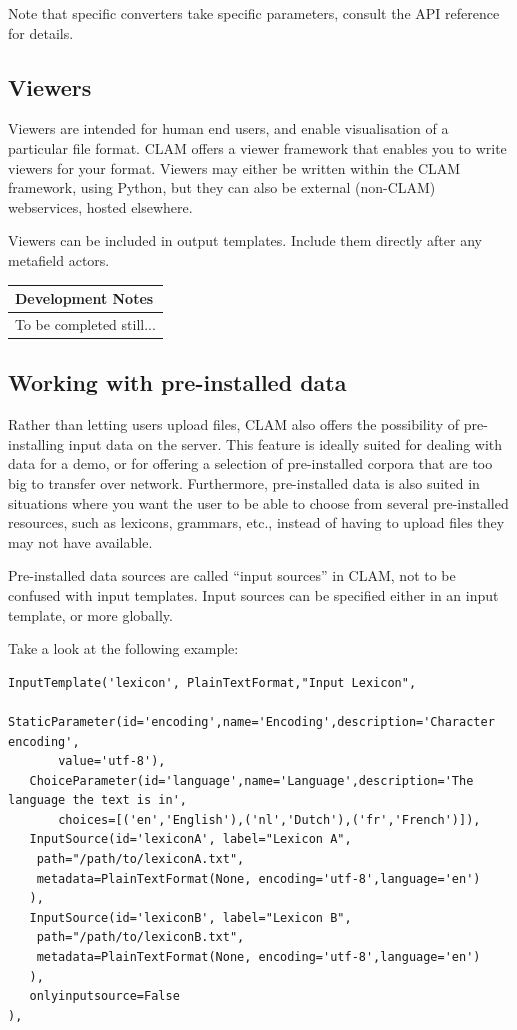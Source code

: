 \documentclass[a4paper,12pt]{report}
\newenvironment{devnotes}
{\newpage
\begin{center}
    \begin{tabular}[h!]{|p{0.8\textwidth}|}
    \hline
    {\bf Development Notes}\\\hline}
{   \\\hline
    \end{tabular}
\end{center}}
\begin{document}
Note that specific converters take specific parameters, consult the API reference for details.


\subsection{Viewers}

Viewers are intended for human end users, and enable visualisation of a
particular file format. CLAM offers a viewer framework that enables you to
write viewers for your format. Viewers may either be written within the CLAM
framework, using Python, but they can also be external (non-CLAM) webservices,
hosted elsewhere.

Viewers can be included in output templates. Include them directly after any
metafield actors.

\begin{devnotes}
To be completed still... %
\end{devnotes}

\subsection{Working with pre-installed data}

Rather than letting users upload files, CLAM also offers the possibility of
pre-installing input data on the server. This feature is ideally suited for
dealing with data for a demo, or for offering a selection of pre-installed
corpora that are too big to transfer over network. Furthermore, pre-installed
data is also suited in situations where you want the user to be able to choose
from several pre-installed resources, such as lexicons, grammars, etc., instead
of having to upload files they may not have available.

Pre-installed data sources are called ``input sources'' in CLAM, not to be
confused with input templates. Input sources can be specified either in an
input template, or more globally. 

Take a look at the following example:

\begin{verbatim}
InputTemplate('lexicon', PlainTextFormat,"Input Lexicon", 
   StaticParameter(id='encoding',name='Encoding',description='Character encoding',
       value='utf-8'),
   ChoiceParameter(id='language',name='Language',description='The language the text is in', 
       choices=[('en','English'),('nl','Dutch'),('fr','French')]),
   InputSource(id='lexiconA', label="Lexicon A",
    path="/path/to/lexiconA.txt", 
    metadata=PlainTextFormat(None, encoding='utf-8',language='en')
   ),
   InputSource(id='lexiconB', label="Lexicon B",
    path="/path/to/lexiconB.txt", 
    metadata=PlainTextFormat(None, encoding='utf-8',language='en')
   ),
   onlyinputsource=False
),            
\end{verbatim}
\end{document}
